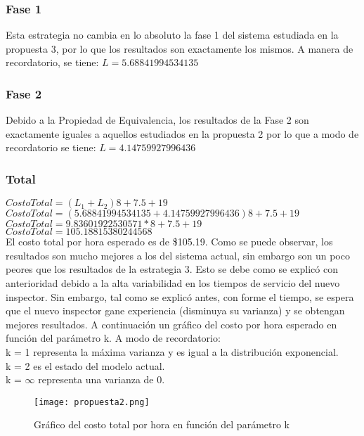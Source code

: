\documentclass{article}
\begin{document}
\subsubsection{Fase 1}
Esta estrategia no cambia en lo absoluto la fase 1 del sistema estudiada 
en la propuesta 3, por lo que 
los resultados son exactamente los mismos. A manera de recordatorio, se tiene:
$ L = 5.68841994534135$
\subsubsection{Fase 2}
Debido a la Propiedad de Equivalencia, los resultados de la Fase 2 
son exactamente iguales a aquellos estudiados en la 
propuesta 2 por lo que a modo de recordatorio se tiene:
$L = 4.14759927996436$
\clearpage
\subsubsection{Total}
\noindent $CostoTotal = \left( L_{1} + L_{2} \right) 8 + 7.5 + 19$ \\
$CostoTotal = \left( 5.68841994534135 + 4.14759927996436\right) 8 + 7.5 + 19$ \\
$CostoTotal = 9.83601922530571*8 + 7.5 + 19$\\
$CostoTotal = 105.18815380244568$\\
El costo total por hora esperado es de \$105.19. 
Como se puede observar, los resultados son mucho mejores a los del 
sistema actual, sin embargo son un poco peores que los resultados de la estrategia 3.
Esto se debe como se explicó con anterioridad debido a la alta variabilidad en los 
tiempos de servicio del nuevo inspector. Sin embargo, tal como se explicó antes, 
con forme el tiempo, se espera que el nuevo inspector gane experiencia (disminuya 
su varianza) y se obtengan mejores resultados. A continuación un gráfico 
del costo por hora esperado en función del parámetro k. A modo de recordatorio:\\
k = 1 representa la máxima varianza y es igual a la distribución exponencial. \\
k = 2 es el estado del modelo actual. \\
k = $\infty$ representa una varianza de 0. 
\begin{figure}[h]
\begin{center}
	\texttt{[image: propuesta2.png]}
		 \caption{Gráfico del costo total por hora en función del parámetro k}
\label{fig3:propuesta2}
\end{center}
\end{figure}
\clearpage
\end{document}
